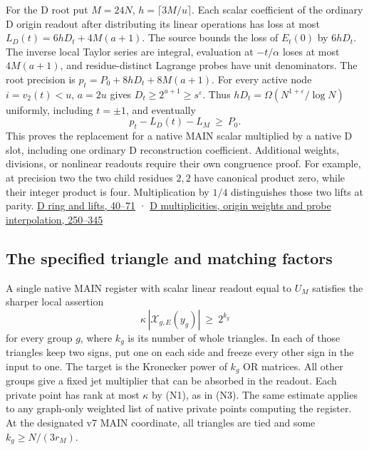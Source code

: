 \documentclass[
  11pt,
]{article}
\begin{document}
For the D root put \(M=24N\), \(h=\lceil3M/u\rceil\). Each scalar
coefficient of the ordinary D origin readout after distributing its
linear operations has loss at most \(L_D(t)=6hD_t+4M(a+1)\). The source
bounds the loss of \(E_t(0)\) by \(6hD_t\). The inverse local Taylor
series are integral, evaluation at \(-t/\alpha\) loses at most
\(4M(a+1)\), and residue-distinct Lagrange probes have unit
denominators. The root precision is \(p_t=P_0+8hD_t+8M(a+1)\). For every
active node \(i=v_2(t)<u\), \(a=2u\) gives
\(D_t\ge2^{u+1}\ge s^\varepsilon\). Thus
\(hD_t=\Omega(N^{1+\varepsilon}/\log N)\) uniformly, including
\(t=\pm1\), and eventually \[
 p_t-L_D(t)-L_M\ \ge\ P_0.
\] This proves the replacement for a native MAIN scalar multiplied by a
native D slot, including one ordinary D reconstruction coefficient.
Additional weights, divisions, or nonlinear readouts require their own
congruence proof. For example, at precision two the two child residues
\(2,2\) have canonical product zero, while their integer product is
four. Multiplication by \(1/4\) distinguishes those two lifts at parity.
\href{https://github.com/openai/math/blob/main/preprints/The-Exponential-Time-Hypothesis-is-False-October-25-2026/build/quantitative-contraction.tex\#L40}{D
ring and lifts, 40--71} ·
\href{https://github.com/openai/math/blob/main/preprints/The-Exponential-Time-Hypothesis-is-False-October-25-2026/build/quantitative-contraction.tex\#L250}{D
multiplicities, origin weights and probe interpolation, 250--345}

\subsection{The specified triangle and matching
factors}\label{v8-the-specified-triangle-and-matching-factors}

A single native MAIN register with scalar linear readout equal to
\(U_M\) satisfies the sharper local assertion \[
 \kappa\,|\mathcal X_{g,E}(y_g)|\ \ge\ 2^{k_g}
\tag{N6}
\] for every group \(g\), where \(k_g\) is its number of whole
triangles. In each of those triangles keep two signs, put one on each
side and freeze every other sign in the input to one. The target is the
Kronecker power of \(k_g\) OR matrices. All other groups give a fixed
jet multiplier that can be absorbed in the readout. Each private point
has rank at most \(\kappa\) by (N1), as in (N3). The same estimate
applies to any graph-only weighted list of native private points
computing the register. At the designated v7 MAIN coordinate, all
triangles are tied and some \(k_g\ge N/(3r_M)\).
\end{document}
